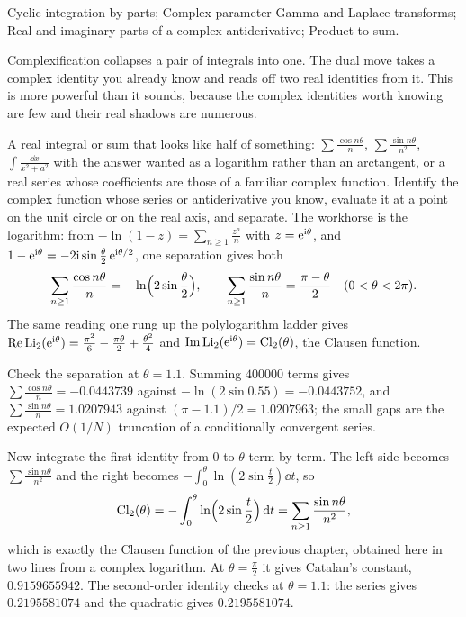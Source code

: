 \begin{seealsob}Cyclic integration by parts; Complex-parameter Gamma and Laplace transforms; Real and imaginary parts of a complex antiderivative; Product-to-sum.\end{seealsob}

Complexification collapses a pair of integrals into one. The dual move takes a complex identity you already know and reads off two real identities from it. This is more powerful than it sounds, because the complex identities worth knowing are few and their real shadows are numerous.

\cue A real integral or sum that looks like half of something: $\sum\frac{\cos n\theta}{n}$, $\sum\frac{\sin n\theta}{n^{2}}$, $\int\frac{\dd x}{x^{2}+a^{2}}$ with the answer wanted as a logarithm rather than an arctangent, or a real series whose coefficients are those of a familiar complex function.
\method Identify the complex function whose series or antiderivative you know, evaluate it at a point on the unit circle or on the real axis, and separate. The workhorse is the logarithm: from $-\ln(1-z)=\sum_{n\geq1}\frac{z^{n}}{n}$ with $z=\mathrm{e}^{\mathrm{i}\theta}$, and $1-\mathrm{e}^{\mathrm{i}\theta}=-2\mathrm{i}\sin\tfrac\theta2\,\mathrm{e}^{\mathrm{i}\theta/2}$, one separation gives both
\[\sum_{n\geq1}\frac{\cos n\theta}{n}=-\ln\Bigl(2\sin\frac\theta2\Bigr),\qquad \sum_{n\geq1}\frac{\sin n\theta}{n}=\frac{\pi-\theta}{2}\quad(0<\theta<2\pi).\]
The same reading one rung up the polylogarithm ladder gives $\operatorname{Re}\operatorname{Li}_2(\mathrm{e}^{\mathrm{i}\theta})=\frac{\pi^{2}}{6}-\frac{\pi\theta}{2}+\frac{\theta^{2}}{4}$ and $\operatorname{Im}\operatorname{Li}_2(\mathrm{e}^{\mathrm{i}\theta})=\operatorname{Cl}_2(\theta)$, the Clausen function.

\begin{worked}
Check the separation at $\theta=1.1$. Summing $400000$ terms gives $\sum\frac{\cos n\theta}{n}=-0.0443739$ against $-\ln(2\sin0.55)=-0.0443752$, and $\sum\frac{\sin n\theta}{n}=1.0207943$ against $(\pi-1.1)/2=1.0207963$; the small gaps are the expected $O(1/N)$ truncation of a conditionally convergent series.

Now integrate the first identity from $0$ to $\theta$ term by term. The left side becomes $\sum\frac{\sin n\theta}{n^{2}}$ and the right becomes $-\int_0^{\theta}\ln(2\sin\tfrac t2)\dd t$, so
\[\operatorname{Cl}_2(\theta)=-\int_0^{\theta}\ln\Bigl(2\sin\frac t2\Bigr)\,\mathrm{d} t=\sum_{n\geq1}\frac{\sin n\theta}{n^{2}},\]
which is exactly the Clausen function of the previous chapter, obtained here in two lines from a complex logarithm. At $\theta=\tfrac\pi2$ it gives Catalan's constant, $0.9159655942$. The second-order identity checks at $\theta=1.1$: the series gives $0.2195581074$ and the quadratic gives $0.2195581074$.
\end{worked}

